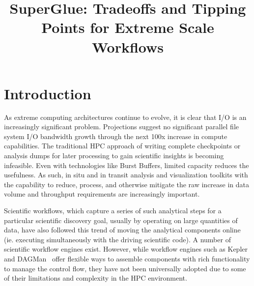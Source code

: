 \documentclass[conference]{IEEEtran}
\begin{document}
\title{SuperGlue: Tradeoffs and Tipping Points for Extreme Scale Workflows}

\author{
}

\maketitle





\section{Introduction}
\label{s:intro}

As extreme computing architectures continue to evolve, it is 
clear that I/O is an increasingly significant problem.  Projections suggest no
significant parallel file system I/O bandwidth growth through the next 100x
increase in compute capabilities.  The traditional HPC approach of writing
complete checkpoints or analysis dumps for later processing to gain scientific
insights is becoming infeasible.  Even with technologies like Burst Buffers,
limited capacity reduces the usefulness. As such, in situ and in transit
analysis and visualization toolkits with the capability to reduce, process, and
otherwise mitigate the raw increase in data volume and throughput requirements
are increasingly important.


Scientific workflows, which 
capture a series of such analytical steps for a
particular scientific discovery goal, usually
by operating on large quantities of data,
have also followed this trend of moving the analytical components
online (ie. executing simultaneously with the driving scientific code).
A number of scientific workflow engines exist.
However, while workflow engines such as
Kepler~\cite{bertram:2006:kepler} and
DAGMan~\cite{Malewicz:2006:dagman}
offer flexible ways to assemble components
with rich functionality to manage the control flow, they have not been
universally adopted due to some of their limitations and complexity in the
HPC environment.
\end{document}
